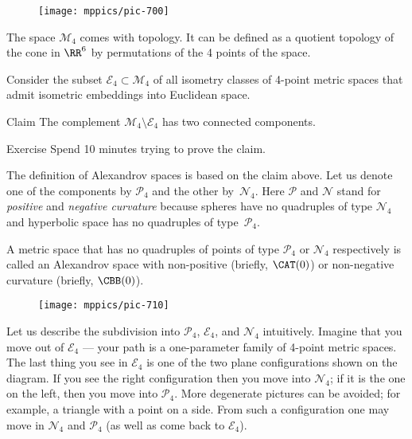 {

\begin{wrapfigure}{o}{33mm}
\vskip-3mm
\centering
\texttt{[image: mppics/pic-700]}
\end{wrapfigure}

The space $\mathcal{M}_4$ comes with topology.
It can be defined as a quotient topology of the cone in $\RR^6$ by permutations of the 4 points of the space.

Consider the subset $\mathcal{E}_4\subset \mathcal{M}_4$ of all isometry classes of 4-point metric spaces that admit isometric embeddings into Euclidean space.

}

\begin{thm}{Claim}\label{clm:two-components-of-M4}
The complement $\mathcal{M}_4\setminus \mathcal{E}_4$ has two connected components.
\end{thm}

\begin{thm}{Exercise}
Spend 10 minutes trying to prove the claim.
\end{thm}


The definition of Alexandrov spaces is based on the claim above.
Let us denote one of the components by $\mathcal{P}_4$ and the other by~$\mathcal{N}_4$.
Here $\mathcal{P}$ and $\mathcal{N}$ stand for {}\emph{positive} 
and {}\emph{negative curvature} because spheres have no quadruples of type $\mathcal{N}_4$ and 
hyperbolic space
has no quadruples of type~$\mathcal{P}_4$.

A metric space that has no quadruples of points of type $\mathcal{P}_4$ or $\mathcal{N}_4$
respectively 
is called an Alexandrov space with non-positive (briefly, $\CAT(0)$) or non-negative curvature (briefly, $\CBB(0)$).

\begin{wrapfigure}{r}{33mm}
\vskip-0mm
\centering
\texttt{[image: mppics/pic-710]}
\end{wrapfigure}

Let us describe the subdivision into  $\mathcal{P}_4$, $\mathcal{E}_4$, and $\mathcal{N}_4$ intuitively.
Imagine that you move out of $\mathcal{E}_4$ --- your path is a one-parameter family of 4-point metric spaces.
The last thing you see in $\mathcal{E}_4$ is one of the two plane configurations shown on the diagram.
If you see the right configuration then you move into $\mathcal{N}_4$;
if it is the one on the left, then you move into $\mathcal{P}_4$.
More degenerate pictures can be avoided; for example, a triangle with a point on a side.
From such a configuration one may move in $\mathcal{N}_4$ and $\mathcal{P}_4$ (as well as come back to $\mathcal{E}_4$).

